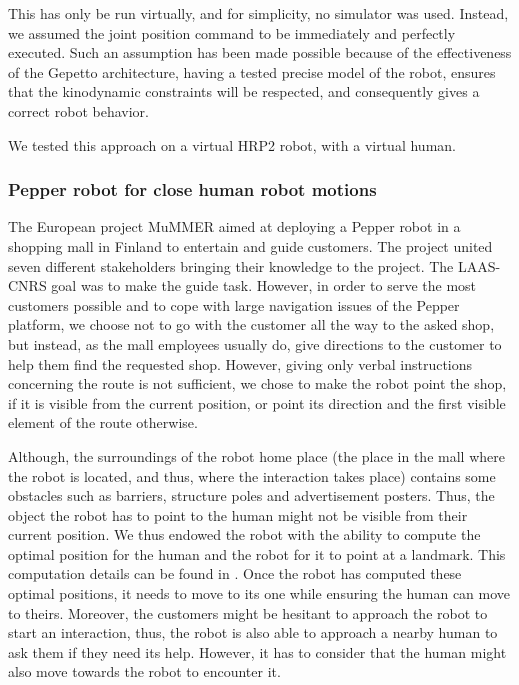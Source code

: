 \documentclass[a4paper,11pt,twoside]{StyleThese}
\begin{document}
This has only be run virtually, and for simplicity, no simulator was used. Instead, we assumed the joint position command to be immediately and perfectly executed. Such an assumption has been made possible because of the effectiveness of the Gepetto architecture, having a tested precise model of the robot, ensures that the kinodynamic constraints will be respected, and consequently gives a correct robot behavior.

We tested this approach on a virtual HRP2 robot, with a virtual human.  

\subsubsection{Pepper robot for close human robot motions}
The European project MuMMER aimed at deploying a Pepper robot in a shopping mall in Finland to entertain and guide customers.  The project united seven different stakeholders bringing their knowledge to the project. The LAAS-CNRS goal was to make the guide task. However, in order to serve the most customers possible and to cope with large navigation issues of the Pepper platform, we choose not to go with the customer all the way to the asked shop, but instead, as the mall employees usually do, give directions to the customer to help them find the requested shop.
However, giving only verbal instructions concerning the route is not sufficient, we chose to make the robot point the shop, if it is visible from the current position, or point its direction and the first visible element of the route otherwise.

Although, the surroundings of the robot home place (the place in the mall where the robot is located, and thus, where the interaction takes place) contains some obstacles such as barriers, structure poles and advertisement posters. Thus, the object the robot has to point to the human might not be visible from their current position. We thus endowed the robot with the ability to compute the optimal position for the human and the robot for it to point at a landmark. This computation details can be found in \cite{waldhart_reasoning_shared_2019}. Once the robot has computed these optimal positions, it needs to move to its one while ensuring the human can move to theirs. Moreover, the customers might be hesitant to approach the robot to start an interaction, thus, the robot is also able to approach a nearby human to ask them if they need its help. However, it has to consider that the human might also move towards the robot to encounter it.
\end{document}
